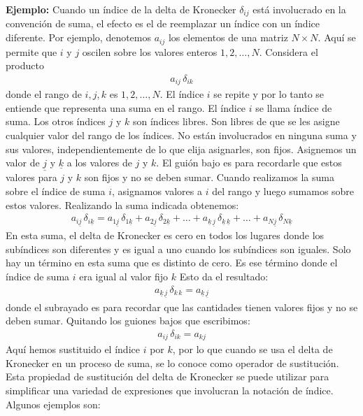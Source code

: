 \noindent
\textbf{Ejemplo:} Cuando un índice de la delta de Kronecker $\delta_{ij}$ está involucrado en la convención de suma, el efecto es el de reemplazar un índice con un índice diferente. Por ejemplo, denotemos $a_{ij}$ los elementos de una matriz $N \times N$. Aquí se permite que $i$ y $j$ oscilen sobre los valores enteros $1, 2, \ldots , N$. Considera el producto
\begin{align*}
a_{ij} \, \delta_{ik}
\end{align*}
donde el rango de $i, j, k$ es $1, 2, \ldots , N$. El índice $i$ se repite y por lo tanto se entiende que representa una suma en el rango. El índice $i$ se llama índice de suma. Los otros índices $j$ y $k$ son índices libres. Son libres de que se les asigne cualquier valor del rango de los índices. No están involucrados en ninguna suma y sus valores, independientemente de lo que elija asignarles, son fijos. Asignemos un valor de $\underline{j}$ y $\underline{k}$ a los valores de $j$ y $k$. El guión bajo es para recordarle que estos valores para $j$ y $k$ son fijos y no se deben sumar. Cuando realizamos la suma sobre el índice de suma $i$, asignamos valores a $i$ del rango y luego sumamos sobre estos valores. Realizando la suma indicada obtenemos:
\begin{align*}
a_{i \underline{j}} \, \delta_{i \underline{k}} = a_{1 \underline{j}} \, \delta_{1 \underline{k}} + a_{2 \underline{j}} \, \delta_{2 \underline{k}} + \ldots + a_{\underline{k} \, \underline{j}} \, \delta_{\underline{k} \, \underline{k}} + \ldots + a_{N \underline{j}} \, \delta_{N \underline{k}}
\end{align*}
En esta suma, el delta de Kronecker es cero en todos los lugares donde los subíndices son diferentes y es igual a uno cuando los subíndices son iguales. Solo hay un término en esta suma que es distinto de cero. Es ese término donde el índice de suma $i$ era igual al valor fijo $k$ Esto da el resultado:
\begin{align*}
a_{\underline{k} \, \underline{j}} \, \delta_{k \, k} = a_{\underline{k} \, \underline{j}}
\end{align*}
donde el subrayado es para recordar que las cantidades tienen valores fijos y no se deben sumar. Quitando los guiones bajos que escribimos:
\begin{align*}
a_{ij} \, \delta_{i k} = a_{k j}
\end{align*}
Aquí hemos sustituido el índice $i$ por $k$, por lo que cuando se usa el delta de Kronecker en un proceso de suma, se lo conoce como operador de sustitución. Esta propiedad de sustitución del delta de Kronecker se puede utilizar para simplificar una variedad de expresiones que involucran la notación de índice. Algunos ejemplos son:
